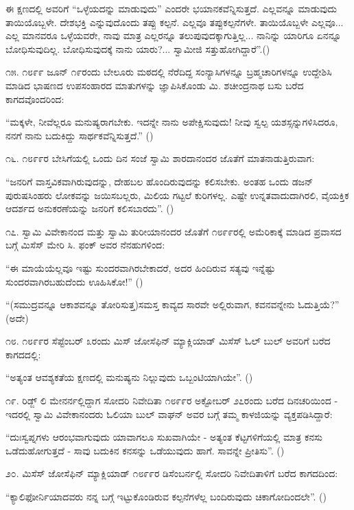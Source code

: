 ಈ ಕ್ಷಣದಲ್ಲಿ ಅವರಿಗೆ “ಒಳ್ಳೆಯದನ್ನು ಮಾಡುವುದು” ಎಂದರೇ ಭಯಾನಕವೆನ್ನಿಸುತ್ತದೆ. ಎಲ್ಲವನ್ನೂ ಮಾಡುವುದು ತಾಯಿಯೊಬ್ಬಳೇ. ದೇಶಭಕ್ತಿ ಎನ್ನುವುದೊಂದು ತಪ್ಪು ಕಲ್ಪನೆ. ಎಲ್ಲವೂ ತಪ್ಪುಕಲ್ಪನೆಗಳೇ. ತಾಯಿಯೊಬ್ಬಳೇ ಎಲ್ಲವೂ... ಎಲ್ಲ ಮಾನವರೂ ಒಳ್ಳೆಯವರೇ, ನಾವು ಮಾತ್ರ ಎಲ್ಲರನ್ನೂ ತಲುಪುವುದಕ್ಕಾಗುತ್ತಿಲ್ಲ... ನಾನಿನ್ನು ಯಾರಿಗೂ ಏನನ್ನೂ ಬೋಧಿಸುವುದಿಲ್ಲ. ಬೋಧಿಸುವುದಕ್ಕೆ ನಾನು ಯಾರು?... ಸ್ವಾಮೀಜಿ ಸತ್ತುಹೋಗಿದ್ದಾರೆ”.()

೧೫. ೧೮೯೯ ಜೂನ್ ೧೯ರಂದು ಬೇಲೂರು ಮಠದಲ್ಲಿ ನೆರೆದಿದ್ದ ಸಂನ್ಯಾಸಿಗಳನ್ನೂ ಬ್ರಹ್ಮಚಾರಿಗಳನ್ನೂ ಉದ್ದೇಶಿಸಿ ಮಾಡಿದ ಭಾಷಣದ ಉಪಸಂಹಾರದ ಮಾತುಗಳನ್ನು ಜ್ಞಾಪಿಸಿಕೊಂಡು ಮಿ. ಶಚೀಂದ್ರನಾಥ ಬಸು ಬರೆದ ಕಾಗದವೊಂದರಿಂದ:

“ಮಕ್ಕಳೇ, ನೀವೆಲ್ಲರೂ ಮನುಷ್ಯರಾಗಬೇಕು. ಇದನ್ನೇ ನಾನು ಅಪೇಕ್ಷಿಸುವುದು! ನೀವು ಸ್ವಲ್ಪ ಯಶಸ್ಸನ್ನುಗಳಿಸಿದರೂ, ನನಗೆ ನಾನು ಬದುಕಿದ್ದು ಸಾರ್ಥಕವೆನ್ನಿಸುತ್ತದೆ.” ()

೧೬. ೧೮೯೯ರ ಬೇಸಿಗೆಯಲ್ಲಿ ಒಂದು ದಿನ ಸಂಜೆ ಸ್ವಾಮಿ ಶಾರದಾನಂದರ ಜೊತೆಗೆ ಮಾತನಾಡುತ್ತಿರುವಾಗ:

“ಜನರಿಗೆ ವಾಸ್ತವಿಕವಾಗಿರುವುದನ್ನು, ದೇಹಬಲ ಹೊಂದಿರುವುದನ್ನು ಕಲಿಸಬೇಕು. ಅಂತಹ ಒಂದು ಡಜನ್ ಪುರುಷಸಿಂಹರು ಲೋಕವನ್ನು ಜಯಿಸಬಲ್ಲರು, ಮಿಲಿಯ ಗಟ್ಟಲೆ ಕುರಿಗಳಲ್ಲ. ಎಷ್ಟೇ ಉನ್ನತವಾದುದಾಗಿರಲಿ, ವೈಯಕ್ತಿಕ ಆದರ್ಶದ ಅನುಕರಣೆಯನ್ನು ಜನರಿಗೆ ಕಲಿಸಬಾರದು”. ()

೧೭. ಸ್ವಾಮಿ ವಿವೇಕಾನಂದ ಮತ್ತು ಸ್ವಾಮಿ ತುರೀಯಾನಂದರ ಜೊತೆಗೆ ೧೮೯೯ರಲ್ಲಿ ಅಮೆರಿಕಾಕ್ಕೆ ಮಾಡಿದ ಪ್ರವಾಸದ ಬಗ್ಗೆ ಮಿಸೆಸ್ ಮೇರಿ ಸಿ. ಫಂಕ್ ಅವರ ನೆನಹುಗಳಿಂದ:

“ಈ ಮಾಯೆಯೆಲ್ಲವೂ ಇಷ್ಟು ಸುಂದರವಾಗಿರಬೇಕಾದರೆ, ಅದರ ಹಿಂದಿರುವ ಸತ್ಯವು ಇನ್ನೆಷ್ಟು ಸುಂದರವಾಗಿರಬಹುದೆಂದು ಊಹಿಸಿಕೋ!” ()

“(ಸಮುದ್ರವನ್ನೂ ಆಕಾಶವನ್ನೂ ತೋರಿಸುತ್ತ)ಸಮಸ್ತ ಕಾವ್ಯದ ಸಾರವೇ ಅಲ್ಲಿರುವಾಗ, ಕವನವನ್ನೇನು ಓದುತ್ತಿಯೆ?” (ಅದೇ)

೧೮. ೧೮೯೯ರ ಸೆಪ್ಟೆಂಬರ್ ೩ರಂದು ಮಿಸ್ ಜೋಸೆಫಿನ್ ಮ್ಯಾಕ್ಲಿಯಾಡ್ ಮಿಸೆಸ್ ಓಲ್ ಬುಲ್ ಅವರಿಗೆ ಬರೆದ ಕಾಗದದಲ್ಲಿ:

“ಅತ್ಯಂತ ಆವಶ್ಯಕತೆಯ ಕ್ಷಣದಲ್ಲಿ ಮನುಷ್ಯನು ನಿಲ್ಲುವುದು ಒಬ್ಬಂಟಿಯಾಗಿಯೇ”. ()

೧೯. ರಿಡ್ಜ್ ಲಿ ಮೇನರ್ನಲ್ಲಿದ್ದಾಗ ಸೋದರಿ ನಿವೇದಿತಾ ೧೮೯೯ರ ಅಕ್ಟೋಬರ್ ೨೭ರಂದು ಬರೆದ ದಿನಚರಿಯಿಂದ - ಇದರಲ್ಲಿ ಸ್ವಾಮಿ ವಿವೇಕಾನಂದರು ಓಲಿಯಾ ಬುಲ್ ವಾಘನ್ ಅವರ ಬಗ್ಗೆ ತಮ್ಮ ಕಾಳಜಿಯನ್ನು ವ್ಯಕ್ತಪಡಿಸಿದ್ದಾರೆ:

“ದುಃಸ್ವಪ್ನಗಳು ಆರಂಭವಾಗುವುದು ಯಾವಾಗಲೂ ಸುಖವಾಗಿಯೇ - ಅತ್ಯಂತ ಕೆಟ್ಟಗಳಿಗೆಯಲ್ಲಿ ಮಾತ್ರ ಕನಸು ಒಡೆದುಹೋಗುತ್ತದೆ - ಸಾವು ಬದುಕಿನ ಕನಸನ್ನು ಒಡೆಯುವುದು ಹಾಗೆ. ಸಾವನ್ನೇ ಪ್ರೀತಿಸು”. ()

೨೦. ಮಿಸೆಸ್ ಜೋಸೆಫಿನ್ ಮ್ಯಾಕ್ಲಿಯಾಡ್ ೧೮೯೯ರ ಡಿಸೆಂಬರ್ನಲ್ಲಿ ಸೋದರಿ ನಿವೇದಿತಾಳಿಗೆ ಬರೆದ ಕಾಗದದಿಂದ:

“ಕ್ಯಾಲಿಫೋರ್ನಿಯಾದವರು ನನ್ನ ಬಗ್ಗೆ ಇಟ್ಟುಕೊಂಡಿರುವ ಕಲ್ಪನೆಗಳೆಲ್ಲ ಬಂದಿರುವುದು ಚಿಕಾಗೋದಿಂದಲೇ”. ()

